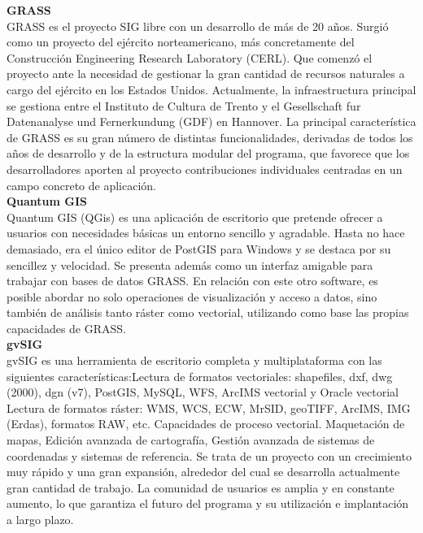 \documentclass[12pt]{report}
\begin{document}
{{{{{{{{{{{{{{{				
				
				{\bf{ GRASS}}\\
				GRASS es el proyecto SIG libre  con un desarrollo de más de 20 años. Surgió como un proyecto del ejército norteamericano, más concretamente del Construcción Engineering Research Laboratory (CERL). Que comenzó el proyecto ante la necesidad de gestionar la gran cantidad de recursos naturales a cargo del ejército en los Estados Unidos. Actualmente, la infraestructura principal se gestiona entre el Instituto de Cultura de Trento y el Gesellschaft fur Datenanalyse und Fernerkundung (GDF) en Hannover.
				La principal característica de GRASS es su gran número de distintas funcionalidades, derivadas de todos los años de desarrollo y de la estructura modular del programa, que favorece que los desarrolladores aporten al proyecto contribuciones individuales centradas en un campo concreto de aplicación.\\
				
				{\bf{ Quantum GIS}}\\
				Quantum GIS (QGis)  es una aplicación de escritorio que pretende ofrecer a usuarios con necesidades básicas un entorno sencillo y agradable. Hasta no hace demasiado, era el único editor de PostGIS para Windows y se destaca por su sencillez y velocidad. Se presenta además como un interfaz amigable para trabajar con bases de datos GRASS. En relación con este otro software, es posible abordar no solo operaciones de visualización y acceso a datos, sino también de análisis tanto ráster como vectorial, utilizando como base las propias capacidades de GRASS.\\
			
				{\bf{ gvSIG}}\\
				gvSIG es una herramienta de escritorio completa y multiplataforma con las siguientes características:Lectura de formatos vectoriales: shapefiles, dxf, dwg (2000), dgn (v7), PostGIS, MySQL, WFS, ArcIMS vectorial y Oracle vectorial Lectura de formatos ráster: WMS, WCS, ECW, MrSID, geoTIFF, ArcIMS, IMG (Erdas), formatos RAW, etc. 
				Capacidades de proceso vectorial. Maquetación de mapas, Edición avanzada de cartografía, Gestión avanzada de sistemas de coordenadas y sistemas de referencia. Se trata de un proyecto con un crecimiento muy rápido y una gran expansión, alrededor del cual se desarrolla actualmente gran cantidad de trabajo. La comunidad de usuarios es amplia y en constante aumento, lo que garantiza el futuro del programa y su utilización e implantación a largo plazo.\\
				
}}}}}}}}}}}}}}}
\end{document}
